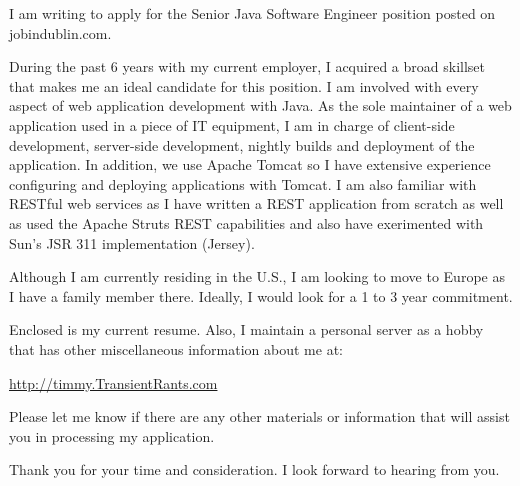 \documentclass[10pt,stdletter,dateno]{newlfm}
\begin{document}
\begin{newlfm}

I am writing to apply for the Senior Java Software Engineer position posted on jobindublin.com.

During the past 6 years with my current employer, I acquired a broad skillset 
that makes me an ideal candidate for this position.  I am involved with every aspect of web application 
development with Java.  As the sole maintainer of a web application used in a piece of IT equipment, I am 
in charge of client-side development, server-side development, nightly builds and deployment 
of the application.  In addition, we use Apache Tomcat so I have extensive experience configuring and 
deploying applications with Tomcat.  I am also familiar with RESTful web services as I have written 
a REST application from scratch as well as used the Apache Struts REST capabilities and also have exerimented with 
Sun's JSR 311 implementation (Jersey). 

Although I am currently residing in the U.S., I am looking to move to Europe as I have a family member there.  
Ideally, I would look for a 1 to 3 year commitment.  

Enclosed is my current resume.  Also, I maintain a personal server as a hobby that has 
other miscellaneous information about me at:

\url{http://timmy.TransientRants.com}

Please let me know if there are any other materials or information that will assist you in processing my application.

Thank you for your time and consideration.  I look forward to hearing from you.

\end{newlfm}
\end{document}
